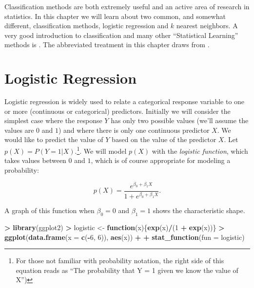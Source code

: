 \documentclass[]{krantz}
\makeatletter
\newenvironment{Shaded}{\begin{snugshade}}{\end{snugshade}}
\newcommand{\KeywordTok}[1]{\textcolor[rgb]{0.27,0.27,0.27}{\textbf{#1}}}
\newcommand{\DataTypeTok}[1]{\textcolor[rgb]{0.27,0.27,0.27}{#1}}
\newcommand{\DecValTok}[1]{\textcolor[rgb]{0.06,0.06,0.06}{#1}}
\newcommand{\StringTok}[1]{\textcolor[rgb]{0.5,0.5,0.5}{#1}}
\newcommand{\ControlFlowTok}[1]{\textcolor[rgb]{0.27,0.27,0.27}{\textbf{#1}}}
\newcommand{\OperatorTok}[1]{\textcolor[rgb]{0.43,0.43,0.43}{\textbf{#1}}}
\newcommand{\NormalTok}[1]{#1}
\newenvironment{kframe}{%
\medskip{}
\setlength{\fboxsep}{.8em}
 \def\at@end@of@kframe{}%
 \ifinner\ifhmode%
  \def\at@end@of@kframe{\end{minipage}}%
  \begin{minipage}{\columnwidth}%
 \fi\fi%
 \def\FrameCommand##1{\hskip\@totalleftmargin \hskip-\fboxsep
 \colorbox{shadecolor}{##1}\hskip-\fboxsep
     \hskip-\linewidth \hskip-\@totalleftmargin \hskip\columnwidth}%
 \MakeFramed {\advance\hsize-\width
   \@totalleftmargin\z@ \linewidth\hsize
   \@setminipage}}%
 {\par\unskip\endMakeFramed%
 \at@end@of@kframe}
\renewenvironment{Shaded}{\begin{kframe}}{\end{kframe}}
\makeatother
\begin{document}
Classification methods are both extremely useful and an active area of
research in statistics. In this chapter we will learn about two common,
and somewhat different, classification methods, logistic regression and
\(k\) nearest neighbors. A very good introduction to classification and
many other ``Statistical Learning'' methods is \citet{JamesEtAl}. The
abbreviated treatment in this chapter draws from \citet{JamesEtAl}.

\section{Logistic Regression}\label{logistic-regression}

Logistic regression is widely used to relate a categorical response
variable to one or more (continuous or categorical) predictors.
Initially we will consider the simplest case where the response \(Y\)
has only two possible values (we'll assume the values are \(0\) and
\(1\)) and where there is only one continuous predictor \(X\). We would
like to predict the value of \(Y\) based on the value of the predictor
\(X\). Let \(p(X) = P(Y = 1 | X)\).\footnote{For those not familiar with
  probability notation, the right side of this equation reads as ``The
  probability that Y = 1 given we know the value of X'')}. We will model
\(p(X)\) with the \emph{logistic function}, which takes values between
\(0\) and \(1\), which is of course appropriate for modeling a
probability:

\[
p(X) = \frac{e^{\beta_0 + \beta_1 X}}{1 + e^{\beta_0 + \beta_1 X}}.
\]

A graph of this function when \(\beta_0=0\) and \(\beta_1 = 1\) shows
the characteristic shape.

\begin{Shaded}
\begin{Highlighting}[]
\OperatorTok{>}\StringTok{ }\KeywordTok{library}\NormalTok{(ggplot2)}
\OperatorTok{>}\StringTok{ }\NormalTok{logistic <-}\StringTok{ }\ControlFlowTok{function}\NormalTok{(x)\{}\KeywordTok{exp}\NormalTok{(x)}\OperatorTok{/}\NormalTok{(}\DecValTok{1} \OperatorTok{+}\StringTok{ }\KeywordTok{exp}\NormalTok{(x))\}}
\OperatorTok{>}\StringTok{ }\KeywordTok{ggplot}\NormalTok{(}\KeywordTok{data.frame}\NormalTok{(}\DataTypeTok{x =} \KeywordTok{c}\NormalTok{(}\OperatorTok{-}\DecValTok{6}\NormalTok{, }\DecValTok{6}\NormalTok{)), }\KeywordTok{aes}\NormalTok{(x)) }\OperatorTok{+}
\OperatorTok{+}\StringTok{   }\KeywordTok{stat_function}\NormalTok{(}\DataTypeTok{fun =}\NormalTok{ logistic)}
\end{Highlighting}
\end{Shaded}
\end{document}
